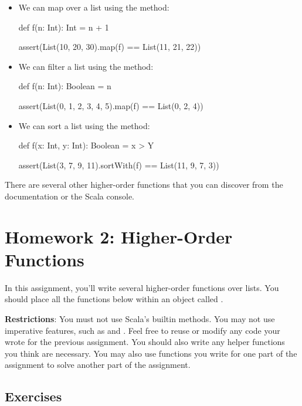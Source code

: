\documentclass{book}
\begin{document}
\begin{itemize}

\item
We can map over a list using the  method:

\begin{scalacode}
def f(n: Int): Int = n + 1

assert(List(10, 20, 30).map(f) == List(11, 21, 22))
\end{scalacode}

\item We can filter a list using the  method:

\begin{scalacode}
def f(n: Int): Boolean = n %

assert(List(0, 1, 2, 3, 4, 5).map(f) == List(0, 2, 4))
\end{scalacode}

\item We can sort a list using the  method:

\begin{scalacode}
def f(x: Int, y: Int): Boolean = x > Y

assert(List(3, 7, 9, 11).sortWith(f) == List(11, 9, 7, 3))
\end{scalacode}

\end{itemize}

There are several other higher-order functions that you can discover from
the documentation or the Scala console.

\chapter{\texorpdfstring{Homework 2: Higher-Order Functions}{file:hw/hw2}}

In this assignment, you'll write several higher-order functions over lists. You
should place all the functions below within an object called
.

\textbf{Restrictions}: You must not use Scala's builtin methods. You
may not use imperative features, such as  and .
Feel free to reuse or modify any code your wrote for the previous assignment.
You should also write any helper functions you think are necessary. You
may also use functions you write for one part of the assignment to solve
another part of the assignment.

\section{Exercises}
\end{document}
